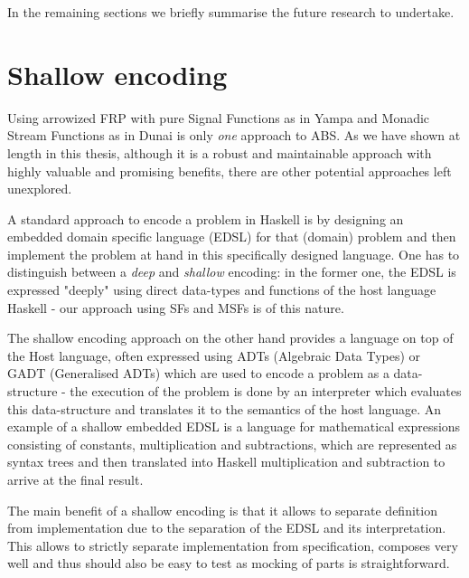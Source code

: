 In the remaining sections we briefly summarise the future research to undertake.

\section{Shallow encoding}
Using arrowized FRP with pure Signal Functions as in Yampa and Monadic Stream Functions as in Dunai is only \textit{one} approach to ABS. As we have shown at length in this thesis, although it is a robust and maintainable approach with highly valuable and promising benefits, there are other potential approaches left unexplored.

A standard approach to encode a problem in Haskell is by designing an embedded domain specific language (EDSL) for that (domain) problem and then implement the problem at hand in this specifically designed language. One has to distinguish between a \textit{deep} and \textit{shallow} encoding: in the former one, the EDSL is expressed "deeply" using direct data-types and functions of the host language Haskell - our approach using SFs and MSFs is of this nature.

The shallow encoding approach on the other hand provides a language on top of the Host language, often expressed using ADTs (Algebraic Data Types) or GADT (Generalised ADTs) which are used to encode a problem as a data-structure - the execution of the problem is done by an interpreter which evaluates this data-structure and translates it to the semantics of the host language. An example of a shallow embedded EDSL is a language for mathematical expressions consisting of constants, multiplication and subtractions, which are represented as syntax trees and then translated into Haskell multiplication and subtraction to arrive at the final result.

The main benefit of a shallow encoding is that it allows to separate definition from implementation due to the separation of the EDSL and its interpretation. This allows to strictly separate implementation from specification, composes very well and thus should also be easy to test as mocking of parts is straightforward.

\medskip


